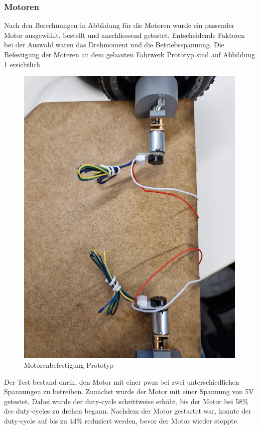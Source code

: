 \subsubsection*{Motoren}


Nach den Berechnungen in Abblidung für die Motoren wurde ein passender Motor ausgewählt, bestellt und anschliessend getestet. Entscheidende Faktoren bei der Auswahl waren das Drehmoment und die Betriebsspannung. Die Befestigung der Moteren an dem gebauten Fahrwerk Prototyp sind auf Abbildung \ref{fig:Motorenaufbau} ersichtlich.

\begin{figure}[H]
    \centering
    \includegraphics[width=0.8\linewidth]{img/Motorenaufbau.jpg}
    \caption{Motorenbefestigung Prototyp}
    \label{fig:Motorenaufbau}
\end{figure}

Der Test bestand darin, den Motor mit einer \acrfull{pwm} bei zwei unterschiedlichen Spannungen zu betreiben. Zunächst wurde der Motor mit einer Spannung von 5V getestet. Dabei wurde der \gls{duty-cycle} schrittweise erhöht, bis der Motor bei 58\% des \gls{duty-cycle}s zu drehen begann. Nachdem der Motor gestartet war, konnte der \gls{duty-cycle} auf bis zu 44\% reduziert werden, bevor der Motor wieder stoppte.

